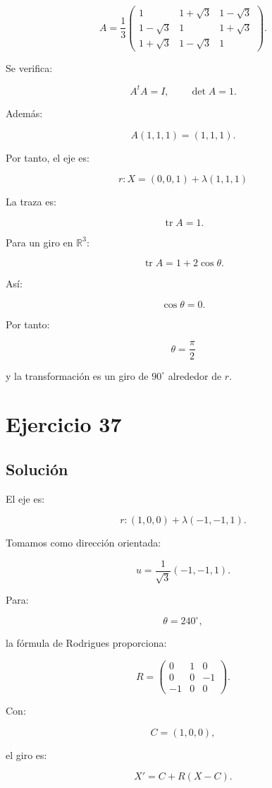 \documentclass[11pt,a4paper]{article}
\newcommand{\R}{\mathbb{R}}
\newcommand{\tr}{\operatorname{tr}}
\begin{document}
\[
A=
\frac13
\begin{pmatrix}
1&1+\sqrt3&1-\sqrt3\\
1-\sqrt3&1&1+\sqrt3\\
1+\sqrt3&1-\sqrt3&1
\end{pmatrix}.
\]

Se verifica:

\[
A^tA=I,
\qquad
\det A=1.
\]

Además:

\[
A(1,1,1)=(1,1,1).
\]

Por tanto, el eje es:

\[
\boxed{
r:
X=(0,0,1)+\lambda(1,1,1)
}
\]

La traza es:

\[
\tr A=1.
\]

Para un giro en \(\R^3\):

\[
\tr A=1+2\cos\theta.
\]

Así:

\[
\cos\theta=0.
\]

Por tanto:

\[
\boxed{
\theta=\frac{\pi}{2}
}
\]

y la transformación es un giro de \(90^\circ\) alrededor de \(r\).

\section{Ejercicio 37}
\subsection{Solución}

El eje es:

\[
r:
(1,0,0)+\lambda(-1,-1,1).
\]

Tomamos como dirección orientada:

\[
u=
\frac1{\sqrt3}(-1,-1,1).
\]

Para:

\[
\theta=240^\circ,
\]

la fórmula de Rodrigues proporciona:

\[
R=
\begin{pmatrix}
0&1&0\\
0&0&-1\\
-1&0&0
\end{pmatrix}.
\]

Con:

\[
C=(1,0,0),
\]

el giro es:

\[
X'=C+R(X-C).
\]
\end{document}
